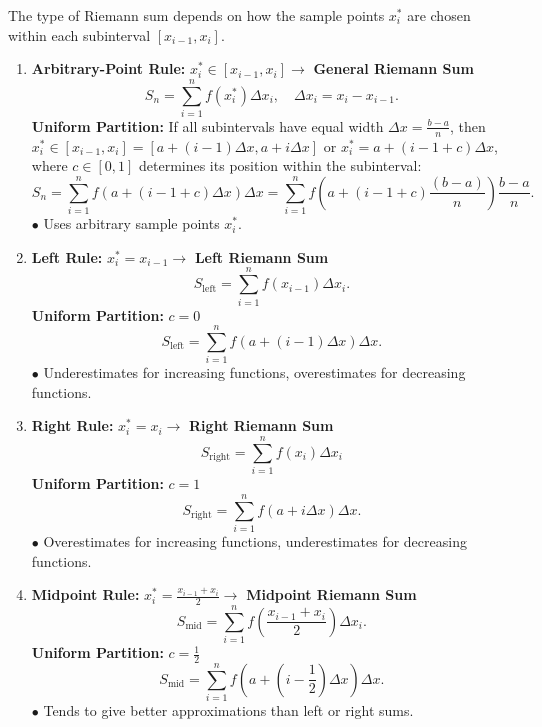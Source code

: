 \documentclass[a4paper,11pt]{article}
\begin{document}
\begin{tcolorbox}[breakable]
    The type of Riemann sum depends on how the sample points $x_i^*$ are chosen within each subinterval $[x_{i-1}, x_i]$.
    \begin{enumerate}
        \item \textbf{Arbitrary-Point Rule:} $x_i^* \in [x_{i-1}, x_i] \rightarrow$ \textbf{General Riemann Sum}
        \[
        S_n = \sum_{i=1}^{n} f(x_i^*) \Delta x_i, \quad \Delta x_i = x_i - x_{i-1}.
        \]
        \textbf{Uniform Partition:} If all subintervals have equal width $\Delta x = \frac{b-a}{n}$, then \\ $x_i^* \in [x_{i-1}, x_i] = [a + (i - 1) \Delta x, a + i \Delta x]$ or $x_i^* = a + (i - 1 + c) \Delta x$, where $c \in [0,1]$ determines its position within the subinterval:
        \[
        S_n = \sum_{i=1}^{n} f(a + (i - 1 + c) \Delta x) \Delta x = \sum_{i=1}^{n} f(a + (i - 1 + c) \frac{(b - a)}{n}) \frac{b - a}{n}.
        \]
        $\bullet$ Uses arbitrary sample points $x_i^*$.
    
        \item \textbf{Left Rule:} $x_i^* = x_{i-1}\rightarrow$ \textbf{Left Riemann Sum}
        \[
        S_{\text{left}} = \sum_{i=1}^n f(x_{i-1}) \Delta x_i.
        \]
        \textbf{Uniform Partition:} $c = 0$
        \[
        S_{\text{left}} = \sum_{i=1}^n f(a + (i - 1) \Delta x) \Delta x.
        \]
        $\bullet$ Underestimates for increasing functions, overestimates for decreasing functions.
        
        \item \textbf{Right Rule:} $x_i^* = x_i\rightarrow$ \textbf{Right Riemann Sum}
        \[
        S_{\text{right}} = \sum_{i=1}^n f(x_i) \Delta x_i    
        \]
        \textbf{Uniform Partition:} $c = 1$
        \[
        S_{\text{right}} = \sum_{i=1}^n f(a + i \Delta x) \Delta x.
        \]
        $\bullet$ Overestimates for increasing functions, underestimates for decreasing functions.
        
        \item \textbf{Midpoint Rule:} $x_i^* = \frac{x_{i-1} + x_i}{2} \rightarrow$ \textbf{Midpoint Riemann Sum}
        \[
        S_{\text{mid}} = \sum_{i=1}^n f\left( \frac{x_{i-1} + x_i}{2} \right) \Delta x_i.
        \]
        \textbf{Uniform Partition:} $c = \frac{1}{2}$
        \[
        S_{\text{mid}} = \sum_{i=1}^n f(a + (i - \frac{1}{2}) \Delta x) \Delta x.
        \]
        $\bullet$ Tends to give better approximations than left or right sums.
        

\end{enumerate}
\end{tcolorbox}
\end{document}

